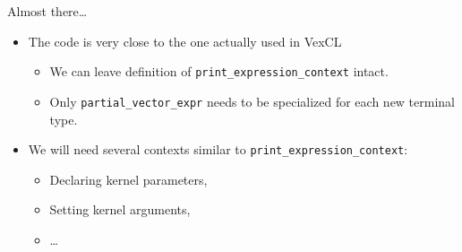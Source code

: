 \documentclass[@BEAMER_OPTIONS@]{beamer}
\newcommand{\code}[1]{\lstinline|#1|}
\begin{document}
\note{}

\begin{frame}{Almost there\ldots}
    \begin{itemize}
        \item The code is very close to the one actually used in VexCL
            \begin{itemize}
                \item We can leave definition of
                    \code{print_expression_context} intact.
                \item Only \code{partial_vector_expr} needs to be specialized
                    for each new terminal type.
            \end{itemize}
        \item We will need several contexts similar to
            \code{print_expression_context}:
            \begin{itemize}
                \item Declaring kernel parameters,
                \item Setting kernel arguments,
                \item \ldots
            \end{itemize}
    \end{itemize}
\end{frame}

\note{}
\end{document}
